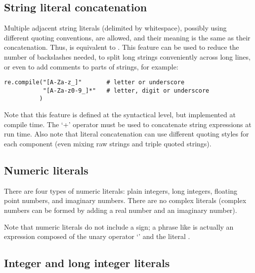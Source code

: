 \subsection{String literal concatenation\label{string-catenation}}

Multiple adjacent string literals (delimited by whitespace), possibly
using different quoting conventions, are allowed, and their meaning is
the same as their concatenation.  Thus,  is
equivalent to .  This feature can be used to reduce
the number of backslashes needed, to split long strings conveniently
across long lines, or even to add comments to parts of strings, for
example:

\begin{verbatim}
re.compile("[A-Za-z_]"       # letter or underscore
           "[A-Za-z0-9_]*"   # letter, digit or underscore
          )
\end{verbatim}

Note that this feature is defined at the syntactical level, but
implemented at compile time.  The `+' operator must be used to
concatenate string expressions at run time.  Also note that literal
concatenation can use different quoting styles for each component
(even mixing raw strings and triple quoted strings).


\subsection{Numeric literals\label{numbers}}

There are four types of numeric literals: plain integers, long
integers, floating point numbers, and imaginary numbers.  There are no
complex literals (complex numbers can be formed by adding a real
number and an imaginary number).

Note that numeric literals do not include a sign; a phrase like
 is actually an expression composed of the unary operator
`\code{-}' and the literal .


\subsection{Integer and long integer literals\label{integers}}

